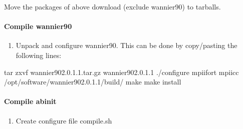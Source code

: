 \documentclass[a4paper,12pt,english]{sphinxmanual}
\begin{document}
\sphinxAtStartPar
Move the packages of above download (exclude wannier90) to tarballs.


\paragraph{Compile wannier90}
\label{\detokenize{compile/abinit_9.4.2:compile-wannier90}}\begin{enumerate}
%
\item {} 
\sphinxAtStartPar
Unpack and configure wannier90. This can be done by copy/pasting the following lines:

\end{enumerate}

\begin{sphinxVerbatim}[commandchars=\\\{\}]
tar zxvf wannier90\PYGZhy{}2.0.1.1.tar.gz  
 wannier90\PYGZhy{}2.0.1.1  
./configure mpiifort mpiicc 
    /opt/software/wannier90\PYGZhy{}2.0.1.1/build/  
make  
make install
\end{sphinxVerbatim}


\paragraph{Compile abinit}
\label{\detokenize{compile/abinit_9.4.2:compile-abinit}}\begin{enumerate}
%
\item {} 
\sphinxAtStartPar
Create configure file compile.sh

\end{enumerate}
\end{document}
